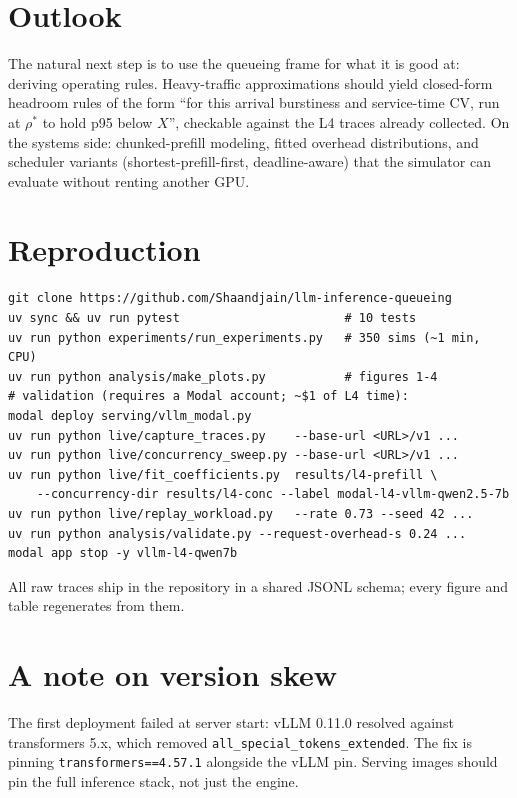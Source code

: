 \documentclass[11pt]{article}
\begin{document}
\section{Outlook}

The natural next step is to use the queueing frame for what it is good at: deriving operating rules. Heavy-traffic approximations should yield closed-form headroom rules of the form ``for this arrival burstiness and service-time CV, run at $\rho^*$ to hold p95 below $X$'', checkable against the L4 traces already collected. On the systems side: chunked-prefill modeling, fitted overhead distributions, and scheduler variants (shortest-prefill-first, deadline-aware) that the simulator can evaluate without renting another GPU.

\appendix

\section{Reproduction}

\begin{lstlisting}
git clone https://github.com/Shaandjain/llm-inference-queueing
uv sync && uv run pytest                       # 10 tests
uv run python experiments/run_experiments.py   # 350 sims (~1 min, CPU)
uv run python analysis/make_plots.py           # figures 1-4
# validation (requires a Modal account; ~$1 of L4 time):
modal deploy serving/vllm_modal.py
uv run python live/capture_traces.py    --base-url <URL>/v1 ...
uv run python live/concurrency_sweep.py --base-url <URL>/v1 ...
uv run python live/fit_coefficients.py  results/l4-prefill \
    --concurrency-dir results/l4-conc --label modal-l4-vllm-qwen2.5-7b
uv run python live/replay_workload.py   --rate 0.73 --seed 42 ...
uv run python analysis/validate.py --request-overhead-s 0.24 ...
modal app stop -y vllm-l4-qwen7b
\end{lstlisting}

All raw traces ship in the repository in a shared JSONL schema; every figure and table regenerates from them.

\section{A note on version skew}

The first deployment failed at server start: vLLM 0.11.0 resolved against transformers 5.x, which removed \texttt{all\_special\_tokens\_extended}. The fix is pinning \texttt{transformers==4.57.1} alongside the vLLM pin. Serving images should pin the full inference stack, not just the engine.
\end{document}
